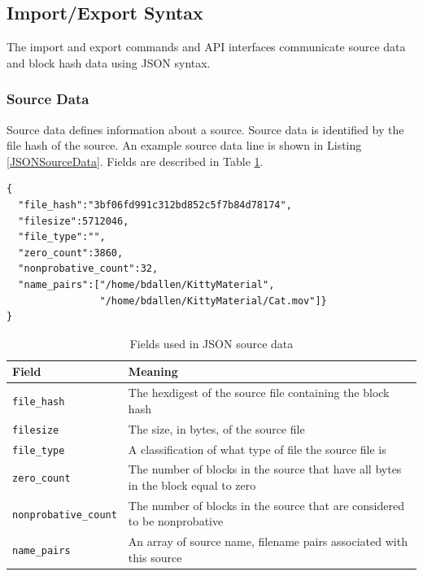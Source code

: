\documentclass[11pt,fleqn]{article} %
\begin{document}
\subsection{Import/Export Syntax}
\label{ImportExportSyntax}
The import and export commands and API interfaces communicate source data and block hash data using JSON syntax.\\

\subsubsection{Source Data}
Source data defines information about a source. Source data is identified by the file hash of the source.  An example source data line is shown in Listing \ref{JSONSourceData}. Fields are described in Table \ref{tab:JSONSourceData}.\\

\lstset{style=customfile}
\begin{lstlisting}[float, caption={Example JSON source data used during import/export}, label=JSONSourceData]
{
  "file_hash":"3bf06fd991c312bd852c5f7b84d78174",
  "filesize":5712046,
  "file_type":"",
  "zero_count":3860,
  "nonprobative_count":32,
  "name_pairs":["/home/bdallen/KittyMaterial",
                "/home/bdallen/KittyMaterial/Cat.mov"]}
}
\end{lstlisting}

\begin{table}[!ht]

\centering
\caption{Fields used in JSON source data}
\label{tab:JSONSourceData}
\begin{tabular}{|p{5 cm}|p{8.8 cm}|}
\hline \hline
\textbf{Field} & \textbf{Meaning} \\
\hline
\verb+file_hash+ & The hexdigest of the source file containing the block hash\\
\hline
\verb+filesize+ & The size, in bytes, of the source file\\
\hline
\verb+file_type+ & A classification of what type of file the source file is\\
\hline
\verb+zero_count+ & The number of blocks in the source that have all bytes in the block equal to zero\\
\hline
\verb+nonprobative_count+ & The number of blocks in the source that are considered to be nonprobative\\
\hline
\verb+name_pairs+ & An array of source name, filename pairs associated with this source\\
\hline
\end{tabular}
\end{table}
\end{document}
